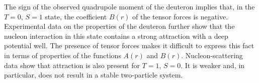The sign of the observed quadrupole moment of the deuteron implies that, in the $T=0$, $S=1$ state, the coefficient $B(r)$ of the tensor forces is negative.
Experimental data on the properties of the deuteron further show that the nucleon interaction in this state contains a strong attraction with a deep potential well.
The presence of tensor forces makes it difficult to express this fact in terms of properties of the functions $A(r)$ and $B(r)$.
Nucleon-scattering data show that attraction is also present for $T=1$, $S=0$.
It is weaker and, in particular, does not result in a stable two-particle system.
